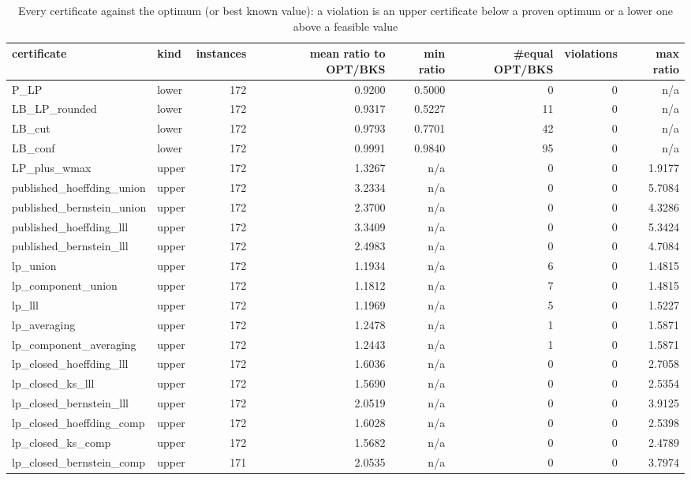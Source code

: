 \begin{table}[htbp]
\centering
\small
\caption{Every certificate against the optimum (or best known value): a violation is an upper certificate below a proven optimum or a lower one above a feasible value}
\label{tab:E1_certificates_certificates}
\begin{tabular}{llrrrrrr}
\toprule
certificate & kind & instances & mean ratio to OPT/BKS & min ratio & \#equal OPT/BKS & violations & max ratio \\
\midrule
P\_LP & lower & 172 & 0.9200 & 0.5000 & 0 & 0 & n/a \\
LB\_LP\_rounded & lower & 172 & 0.9317 & 0.5227 & 11 & 0 & n/a \\
LB\_cut & lower & 172 & 0.9793 & 0.7701 & 42 & 0 & n/a \\
LB\_conf & lower & 172 & 0.9991 & 0.9840 & 95 & 0 & n/a \\
LP\_plus\_wmax & upper & 172 & 1.3267 & n/a & 0 & 0 & 1.9177 \\
published\_hoeffding\_union & upper & 172 & 3.2334 & n/a & 0 & 0 & 5.7084 \\
published\_bernstein\_union & upper & 172 & 2.3700 & n/a & 0 & 0 & 4.3286 \\
published\_hoeffding\_lll & upper & 172 & 3.3409 & n/a & 0 & 0 & 5.3424 \\
published\_bernstein\_lll & upper & 172 & 2.4983 & n/a & 0 & 0 & 4.7084 \\
lp\_union & upper & 172 & 1.1934 & n/a & 6 & 0 & 1.4815 \\
lp\_component\_union & upper & 172 & 1.1812 & n/a & 7 & 0 & 1.4815 \\
lp\_lll & upper & 172 & 1.1969 & n/a & 5 & 0 & 1.5227 \\
lp\_averaging & upper & 172 & 1.2478 & n/a & 1 & 0 & 1.5871 \\
lp\_component\_averaging & upper & 172 & 1.2443 & n/a & 1 & 0 & 1.5871 \\
lp\_closed\_hoeffding\_lll & upper & 172 & 1.6036 & n/a & 0 & 0 & 2.7058 \\
lp\_closed\_ks\_lll & upper & 172 & 1.5690 & n/a & 0 & 0 & 2.5354 \\
lp\_closed\_bernstein\_lll & upper & 172 & 2.0519 & n/a & 0 & 0 & 3.9125 \\
lp\_closed\_hoeffding\_comp & upper & 172 & 1.6028 & n/a & 0 & 0 & 2.5398 \\
lp\_closed\_ks\_comp & upper & 172 & 1.5682 & n/a & 0 & 0 & 2.4789 \\
lp\_closed\_bernstein\_comp & upper & 171 & 2.0535 & n/a & 0 & 0 & 3.7974 \\

\end{tabular}
\end{table}
